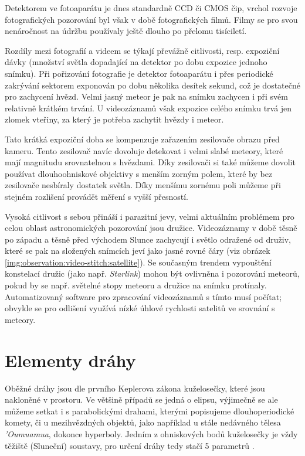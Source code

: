 Detektorem ve fotoaparátu je dnes standardně CCD či CMOS čip, vrchol rozvoje fotografických pozorování byl však v době fotografických filmů. Filmy se pro svou nenáročnost na údržbu používaly ještě dlouho po přelomu tisíciletí.

\smallskip

Rozdíly mezi fotografií a videem se týkají převážně citlivosti, resp. expoziční dávky (množství světla dopadající na detektor po dobu expozice jednoho snímku). Při pořizování fotografie je detektor fotoaparátu i přes periodické zakrývání sektorem exponován po dobu několika desítek sekund, což je dostatečné pro zachycení hvězd. Velmi jasný meteor je pak na snímku zachycen i při svém relativně krátkém trvání. U videozáznamů však expozice celého snímku trvá jen zlomek vteřiny, za který je potřeba zachytit hvězdy i meteor.

Tato krátká expoziční doba se kompenzuje zařazením zesilovače obrazu před kameru. Tento zesilovač navíc dovoluje detekovat i velmi slabé meteory, které mají magnitudu srovnatelnou s hvězdami. Díky zesilovači si také můžeme dovolit používat dlouhoohniskové objektivy s menším zorným polem, které by bez zesilovače nesbíraly dostatek světla. Díky menšímu zornému poli můžeme při stejném rozlišení provádět měření s vyšší přesností.

Vysoká citlivost s sebou přináší i parazitní jevy, velmi aktuálním problémem pro celou oblast astronomických pozorování jsou družice. Videozáznamy v době těsně po západu a těsně před východem Slunce zachycují i světlo odražené od druživ, které se pak na složených snímcích jeví jako jasné rovné čáry (viz obrázek \ref{img:observation:video-stitch:satellite}). Se současným trendem vypouštění konstelací družic (jako např. \textit{Starlink}) mohou být ovlivněna i pozorování meteorů, pokud by se např. světelné stopy meteoru a družice na snímku protínaly. Automatizovaný software pro zpracování videozáznamů s tímto musí počítat; obvykle se pro odlišení využívá nízké úhlové rychlosti satelitů ve srovnání s meteory.

\section{Elementy dráhy}\label{sec:orbit}%
Oběžné dráhy jsou dle prvního Keplerova zákona kuželosečky, které jsou nakloněné v prostoru. Ve většině případů se jedná o elipsu, výjimečně se ale můžeme setkat i s parabolickými drahami, kterými popisujeme dlouhoperiodické komety, či u mezihvězdných objektů, jako například u stále nedávného tělesa \textit{'Oumuamua}, dokonce hyperboly. Jedním z ohniskových bodů kuželosečky je vždy těžiště (Sluneční) soustavy, pro určení dráhy tedy stačí 5 parametrů \cite{astro}.

